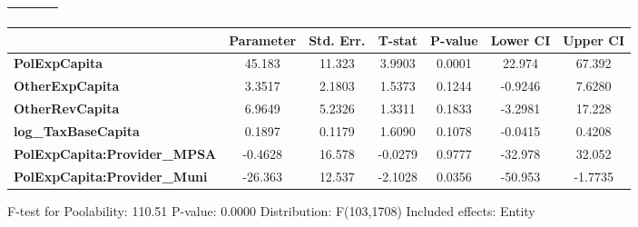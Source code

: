 \begin{center}
\begin{tabular}{lclc}
\textbf{}                            &                    & \textbf{                     }   &                  \\
\bottomrule
\end{tabular}
\begin{tabular}{lcccccc}
                                     & \textbf{Parameter} & \textbf{Std. Err.} & \textbf{T-stat} & \textbf{P-value} & \textbf{Lower CI} & \textbf{Upper CI}  \\
\midrule
\textbf{PolExpCapita}                &       45.183       &       11.323       &      3.9903     &      0.0001      &       22.974      &       67.392       \\
\textbf{OtherExpCapita}              &       3.3517       &       2.1803       &      1.5373     &      0.1244      &      -0.9246      &       7.6280       \\
\textbf{OtherRevCapita}              &       6.9649       &       5.2326       &      1.3311     &      0.1833      &      -3.2981      &       17.228       \\
\textbf{log\_TaxBaseCapita}          &       0.1897       &       0.1179       &      1.6090     &      0.1078      &      -0.0415      &       0.4208       \\
\textbf{PolExpCapita:Provider\_MPSA} &      -0.4628       &       16.578       &     -0.0279     &      0.9777      &      -32.978      &       32.052       \\
\textbf{PolExpCapita:Provider\_Muni} &      -26.363       &       12.537       &     -2.1028     &      0.0356      &      -50.953      &      -1.7735       \\
\bottomrule
\end{tabular}
\end{center}

F-test for Poolability: 110.51 \newline
 P-value: 0.0000 \newline
 Distribution: F(103,1708) \newline
  \newline
 Included effects: Entity